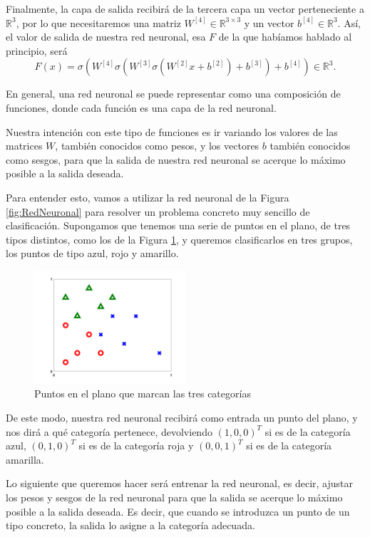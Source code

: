 \documentclass[a4paper,11pt,spanish, twoside, leqno]{tfg-uam}
\theoremstyle{definition}
\begin{document}
Finalmente, la capa de salida recibirá de la tercera capa un vector perteneciente a $\mathbb{R}^3$, por lo que necesitaremos una matriz $W^{[4]}\in\mathbb{R}^{3\times3}$ y un vector $b^{[4]}\in\mathbb{R}^3$. Así, el valor de salida de nuestra red neuronal, esa $F$ de la que habíamos hablado al principio, será
\begin{equation}
    F(x)=\sigma(W^{[4]}\sigma(W^{[3]}\sigma(W^{[2]}x+b^{[2]})+b^{[3]})+b^{[4]})\in\mathbb{R}^3.
\end{equation}\label{eq:RedNeuronal}

En general, una red neuronal se puede representar como una composición de funciones, donde cada función es una capa de la red neuronal. 

Nuestra intención con este tipo de funciones es ir variando los valores de las matrices $W$, también conocidos como pesos, y los vectores $b$ también conocidos como sesgos, para que la salida de nuestra red neuronal se acerque lo máximo posible a la salida deseada. 

Para entender esto, vamos a utilizar la red neuronal de la Figura \ref{fig:RedNeuronal} para resolver un problema concreto muy sencillo de clasificación. Supongamos que tenemos una serie de puntos en el plano, de tres tipos distintos, como los de la Figura \ref{fig:Clasificacion}, y queremos clasificarlos en tres grupos, los puntos de tipo azul, rojo y amarillo.


\begin{figure}
    \centering
    \includegraphics[width=0.5\textwidth]{Figuras/pic_xy.png}
    \caption{Puntos en el plano que marcan las tres categorías}
    \label{fig:Clasificacion}
\end{figure}

De este modo, nuestra red neuronal recibirá como entrada un punto del plano, y nos dirá a qué categoría pertenece, devolviendo $(1,0,0)^T$ si es de la categoría azul, $(0,1,0)^T$ si es de la categoría roja y $(0,0,1)^T$ si es de la categoría amarilla.

Lo siguiente que queremos hacer será entrenar la red neuronal, es decir, ajustar los pesos y sesgos de la red neuronal para que la salida se acerque lo máximo posible a la salida deseada. Es decir, que cuando se introduzca un punto de un tipo concreto, la salida lo asigne a la categoría adecuada. 
\end{document}
